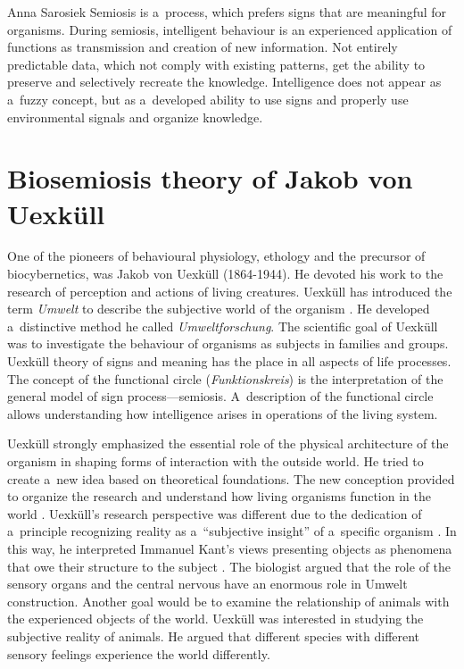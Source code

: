 \begin{artengenv}{Anna Sarosiek}
Semiosis is a~process, which prefers signs that are meaningful for organisms. During semiosis, intelligent behaviour is an experienced application of functions as transmission and creation of new information. Not entirely predictable data, which not comply with existing patterns, get the ability to preserve and selectively recreate the knowledge. Intelligence does not appear as a~fuzzy concept, but as a~developed ability to use signs and properly use environmental signals and organize knowledge.

\section*{Biosemiosis theory of Jakob von Uexküll}
One of the pioneers of behavioural physiology, ethology and the precursor of biocybernetics, was Jakob von Uexküll (1864-1944). He devoted his work to the research of perception and actions of living creatures. Uexküll has introduced the term \textit{Umwelt} to describe the subjective world of the organism
\parencite[][]{uexkull_umwelt_1921}. %
 He developed a~distinctive method he called \textit{Umweltforschung}. The scientific goal of Uexküll was to investigate the behaviour of organisms as subjects in families and groups. Uexküll theory of signs and meaning has the place in all aspects of life processes. The concept of the functional circle (\textit{Funktionskreis}) is the interpretation of the general model of sign process---semiosis. A~description of the functional circle allows understanding how intelligence arises in operations of the living system.

Uexküll strongly emphasized the essential role of the physical architecture of the organism in shaping forms of interaction with the outside world. He tried to create a~new idea based on theoretical foundations. The new conception provided to organize the research and understand how living organisms function in the world
\parencite[][p.7]{uexkull_theoretische_1920}. %
 Uexküll’s research perspective was different due to the dedication of a~principle recognizing reality as a~``subjective insight'' of a~specific organism 
\parencite[][p.9]{uexkull_theoretische_1920}. %
 In this way, he interpreted Immanuel Kant’s views presenting objects as phenomena that owe their structure to the subject 
\parencite[][p.8]{uexkull_theoretische_1920}. %
 The biologist argued that the role of the sensory organs and the central nervous have an enormous role in Umwelt construction. Another goal would be to examine the relationship of animals with the experienced objects of the world. Uexküll was interested in studying the subjective reality of animals. He argued that different species with different sensory feelings experience the world differently.


\end{artengenv}

